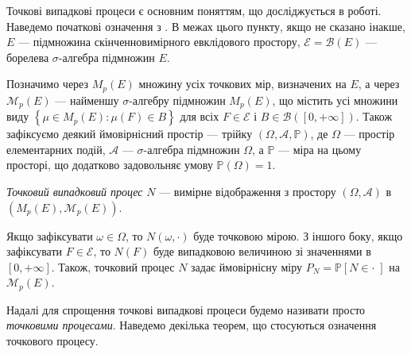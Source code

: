 Точкові випадкові процеси є основним поняттям, що досліджується в роботі.
Наведемо початкові означення з \cite{Resnick_1987}.
В межах цього пункту, якщо не сказано інакше,
$E$ --- підмножина скінченновимірного евклідового простору,
$\mathcal{E} = \mathcal{B}(E)$ --- борелева $\sigma$-алгебра підмножин $E$.

Позначимо через $M_p(E)$ множину усіх точкових мір, визначених на $E$,
а через $\mathcal{M}_p(E)$ --- найменшу $\sigma$-алгебру
підмножин $M_p(E)$, що містить усі множини виду
$\left\{
    \mu \in M_p(E) : \mu(F) \in B
\right\}$ для всіх $F \in \mathcal{E}$ і $B \in \mathcal{B}\left([0, +\infty]\right)$.
Також зафіксуємо деякий ймовірнісний простір --- трійку
$\left(\Omega, \mathcal{A}, \mathbb{P}\right)$, де
$\Omega$ --- простір елементарних подій, $\mathcal{A}$ ---
$\sigma$-алгебра підмножин $\Omega$, а $\mathbb{P}$ --- міра на цьому просторі,
що додатково задовольняє умову $\mathbb{P}\left(\Omega\right) = 1$.
\begin{definition} 
    \emph{Точковий випадковий процес} $N$ --- вимірне відображення
    з простору $\left(\Omega, \mathcal{A}\right)$
    в $\left(M_p(E), \mathcal{M}_p(E)\right)$.
\end{definition}
Якщо зафіксувати $\omega \in \Omega$, то $N(\omega, \cdot)$
буде точковою мірою. З іншого боку, якщо зафіксувати $F \in \mathcal{E}$,
то $N(F)$ буде випадковою величиною зі значеннями в $[0, +\infty]$.
Також, точковий процес $N$ задає ймовірнісну міру 
$P_N = \mathbb{P}\left[N \in \cdot \; \right]$
на $\mathcal{M}_p(E)$.

Надалі для спрощення точкові випадкові процеси
будемо називати просто \emph{точковими процесами}. Наведемо
декілька теорем, що стосуються означення точкового процесу.

